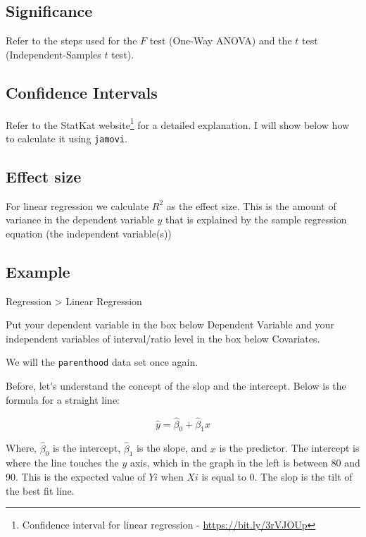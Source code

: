 \documentclass[
]{article}
\begin{document}
\hypertarget{significance-1}{%
\subsection{Significance}\label{significance-1}}

Refer to the steps used for the \(F\) test (One-Way ANOVA) and the \(t\) test (Independent-Samples \(t\) test).

\hypertarget{confidence-intervals}{%
\subsection{Confidence Intervals}\label{confidence-intervals}}

Refer to the StatKat website\footnote{Confidence interval for linear regression - \url{https://bit.ly/3rVJOUp}} for a detailed explanation. I will show below how to calculate it using \texttt{jamovi}.

\hypertarget{effect-size}{%
\subsection{Effect size}\label{effect-size}}

For linear regression we calculate \(R^2\) as the effect size. This is the amount of variance in the dependent variable \(y\) that is explained by the sample regression equation (the independent variable(s))

\hypertarget{example-1}{%
\subsection{Example}\label{example-1}}

Regression \textgreater{} Linear Regression

Put your dependent variable in the box below Dependent Variable and your independent variables of interval/ratio level in the box below Covariates.

We will the \texttt{parenthood} data set once again.

Before, let's understand the concept of the slop and the intercept. Below is the formula for a straight line:

\[
\hat{y}=\hat{\beta}_0+\hat{\beta}_1x
\]

Where, \(\hat{\beta}_0\) is the intercept, \(\hat{\beta}_1\) is the slope, and \(x\) is the predictor. The intercept is where the line touches the \(y\) axis, which in the graph in the left is between 80 and 90. This is the expected value of \(Yi\) when \(Xi\) is equal to 0. The slop is the tilt of the best fit line.
\end{document}
